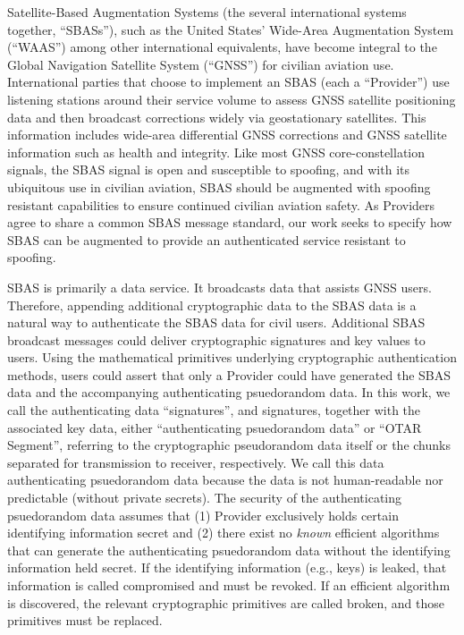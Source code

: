 \documentclass[letterpaper,times]{IONconf/IONconf}
\begin{document}
	Satellite-Based Augmentation Systems (the several international systems together, ``SBASs''), such as the United States' Wide-Area Augmentation System (``WAAS'') among other international equivalents, have become integral to the Global Navigation Satellite System (``GNSS'') for civilian aviation use.
	International parties that choose to implement an SBAS (each a ``Provider'') use listening stations around their service volume to assess GNSS satellite positioning data and then broadcast corrections widely via geostationary satellites.
	This information includes wide-area differential GNSS corrections and GNSS satellite information such as health and integrity.
	Like most GNSS core-constellation signals, the SBAS signal is open and susceptible to spoofing, and with its ubiquitous use in civilian aviation, SBAS should be augmented with spoofing resistant capabilities to ensure continued civilian aviation safety.
	As Providers agree to share a common SBAS message standard, our work seeks to specify how SBAS can be augmented to provide an authenticated service resistant to spoofing.

	SBAS is primarily a data service.
	It broadcasts data that assists GNSS users.
	Therefore, appending additional cryptographic data to the SBAS data is a natural way to authenticate the SBAS data for civil users.
	Additional SBAS broadcast messages could deliver cryptographic signatures and key values to users.
	Using the mathematical primitives underlying cryptographic authentication methods, users could assert that only a Provider could have generated the SBAS data and the accompanying authenticating psuedorandom data.
	In this work, we call the authenticating data ``signatures'', and signatures, together with the associated key data, either ``authenticating psuedorandom data'' or ``OTAR Segment'', referring to the cryptographic pseudorandom data itself or the chunks separated for transmission to receiver, respectively.
	We call this data authenticating psuedorandom data because the data is not human-readable nor predictable (without private secrets).
	The security of the authenticating psuedorandom data assumes that (1) Provider exclusively holds certain identifying information secret and (2) there exist no {\em known} efficient algorithms that can generate the authenticating psuedorandom data without the identifying information held secret.
	If the identifying information (e.g., keys) is leaked, that information is called compromised and must be revoked.
	If an efficient algorithm is discovered, the relevant cryptographic primitives are called broken, and those primitives must be replaced.
\end{document}
